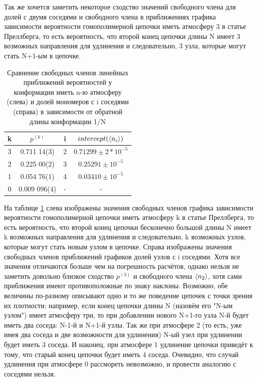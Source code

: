 Так же хочется заметить некоторое сходство значений свободного члена для долей с двумя соседями и свободного члена в приближениях графика зависимости вероятности гомополимерной цепочки иметь атмосферу 3 в статье Преллберга\cite{owczarek2008scaling}, то есть вероятность, что второй конец цепочки длины N имеет 3 возможных направления для удлинения и следовательно, 3 узла, которые могут стать N+1-ым в цепочке.

\begin{table}[]
    \centering
    \begin{tabular}{|c|c|c|c|}
    \hline
    k & $p^{(k)}$ & i & $intercept(\langle n_{i} \rangle)$ \\ \hline
    3 & 0.711 14(3) & 2 & $0.71299 \pm 2*10^{-5}$ \\ \hline
    2 & 0.225 00(2) & 3 & $0.25291 \pm 10^{-5}$ \\ \hline
    1 & 0.054 76(1) & 4 & $0.03410 \pm 10^{-5}$\\ \hline
    0 & 0.009 096(4) & - & - \\ \hline
    \end{tabular}
    \caption{Сравнение свободных членов линейных приближений вероятностей у конформации иметь n-ю атмосферу (слева) и долей мономеров с i соседями (справа) в зависимости от обратной длины конформации 1/N}
    \label{tab:Prellb_Compare}
\end{table}

На таблице \ref{tab:Prellb_Compare} слева изображены значения свободных членов графика зависимости вероятности гомополимерной цепочки иметь атмосферу k в статье Преллберга\cite{owczarek2008scaling}, то есть вероятность, что второй конец цепочки бесконечно большой длины N имеет k возможных направления для удлинения и следовательно, k возможных узлов, которые могут стать новым узлом в цепочке. Справа изображены значения свободных членов приближений графиков долей узлов с i соседями. Хотя все значения отличаются больше чем на погрешность расчётов, однако нельзя не заметить довольно близкое сходство $p^{(3)}$ и свободного члена $\langle n_{2} \rangle$, хотя сами приближения имеют противоположные по знаку наклоны. 
Возможно, обе величины по-разному описывают одно и то же поведение цепочек с точки зрения их плотности: например, если конец цепочки длины N (назовём его "N-ым узлом") имеет атмосферу три, то при добавлении нового N+1-го узла N-й будет иметь два соседа: N-1-й и N+1-й узлы. Так же при атмосфере 2 (то есть, уже имея два соседа и две возможности для удлинения) N-ый узел при удлинении будет иметь 3 соседа. И наконец, при атмосфере 1 удлинение цепочки приведёт к тому, что старый конец цепочки будет иметь 4 соседа. Очевидно, что случай удлинения при атмосфере 0 рассмореть невозможно, и провести аналогию с соседями нельзя.